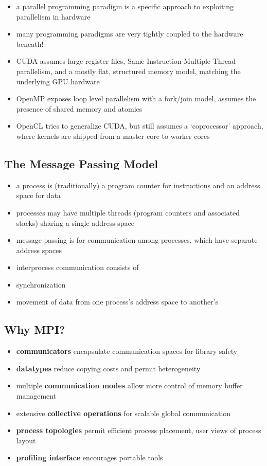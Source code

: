 \documentclass{article}
\begin{document}
\begin{itemize}
\item
  a parallel programming paradigm is a specific approach to exploiting
  parallelism in hardware
\item
  many programming paradigms are very tightly coupled to the hardware
  beneath!
\item
  CUDA assumes large register files, Same Instruction Multiple Thread
  parallelism, and a mostly flat, structured memory model, matching the
  underlying GPU hardware
\item
  OpenMP exposes loop level parallelism with a fork/join model, assumes
  the presence of shared memory and atomics
\item
  OpenCL tries to generalize CUDA, but still assumes a `coprocessor'
  approach, where kernels are shipped from a master core to worker cores
\end{itemize}

    \subsection{The Message Passing Model}\label{the-message-passing-model}

\begin{itemize}
\item
  a process is (traditionally) a program counter for instructions and an
  address space for data
\item
  processes may have multiple threads (program counters and associated
  stacks) sharing a single address space
\item
  message passing is for communication among processes, which have
  separate address spaces
\item
  interprocess communication consists of
\item
  synchronization
\item
  movement of data from one process's address space to another's
\end{itemize}

    \subsection{Why MPI?}\label{why-mpi}

\begin{itemize}
\itemsep1pt\parskip0pt
\item
  \textbf{communicators} encapsulate communication spaces for library
  safety
\item
  \textbf{datatypes} reduce copying costs and permit heterogeneity
\item
  multiple \textbf{communication modes} allow more control of memory
  buffer management
\item
  extensive \textbf{collective operations} for scalable global
  communication
\item
  \textbf{process topologies} permit efficient process placement, user
  views of process layout
\item
  \textbf{profiling interface} encourages portable tools
\end{itemize}
\end{document}
